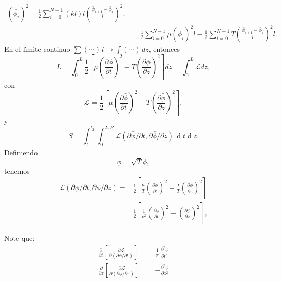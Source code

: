 \begin{frame}
\begin{align}
  \left(
    \dot{\bar{\phi_i}}
  \right)^2-\frac{1}{2}\sum_{i=0}^{N-1}(k l) l
  \left(
\frac{\bar\phi_{i+1}-\bar\phi_{i}}{l}
  \right)^2.\nonumber\\
&=\frac{1}{2}\sum_{i=0}^{N-1}\mu
  \left(
    \dot{\bar{\phi_i}}
  \right)^2l-\frac{1}{2}\sum_{i=0}^{N-1}T
  \left(
\frac{\bar\phi_{i+1}-\bar\phi_{i}}{l}
  \right)^2l.
\label{eq:1strLsumm}
\end{align}
En el l\'\i mite continuo $\sum(\cdots)\,l\to\int(\cdots)\,dz$, entonces 
\begin{equation}
\label{eq:238}
  L=\int_0^L\frac{1}{2}
\left[
  \mu\left(\frac{\partial\bar\phi}{\partial t}\right)^2- T\left(\frac{\partial\bar\phi}{\partial z}\right)^2
\right]dz=\int_0^L\mathcal{L}dz,
\end{equation}
con
\begin{equation}
  \label{eq:call1}
  \mathcal{L}=\frac{1}{2}
\left[
  \mu\left(\frac{\partial\bar\phi}{\partial t}\right)^2- T\left(\frac{\partial\bar\phi}{\partial z}\right)^2
\right],
\end{equation}
y
\begin{equation}
  \label{eq:Scall}
  S=\int_{t_1}^{t_2}\int_0^{2\pi R}\mathcal{L}\left( \partial\bar\phi/\partial t,\partial\bar\phi/\partial z
  \right)\,\operatorname{d}t\operatorname{d}z.
\end{equation}
Definiendo
\begin{equation}
  \label{eq:barff}
  \phi=\sqrt{T}\bar\phi,
\end{equation}
tenemos
\begin{align}
  \label{eq:call2}
  \mathcal{L}(\partial\phi/\partial t,\partial\phi/\partial z)=&
\frac{1}{2}
\left[
  \frac{\mu}{T}\left(\frac{\partial\phi}{\partial t}\right)^2- \frac{T}{T}\left(\frac{\partial\phi}{\partial z}\right)^2
\right]\nonumber\\
=&\frac{1}{2}
\left[
  \frac{1}{v^2}\left(\frac{\partial\phi}{\partial t}\right)^2-\left(\frac{\partial\phi}{\partial z}\right)^2
\right],
\end{align}
\end{frame}
Note que:
\begin{align}
  \label{eq:dcalt}
  \frac{\partial}{\partial t}
  \left[
    \frac{\partial\mathcal{L}}{\partial
      (\partial\phi/\partial t)}
  \right]&=    \frac{1}{v^2}\frac{\partial^2\phi}{\partial t^2}\\
  \label{eq:dcalz} %
  \frac{\partial}{\partial z}
  \left[
    \frac{\partial\mathcal{L}}{\partial
      (\partial\phi/\partial z)}
  \right]&= -\frac{\partial^2\phi}{\partial z^2}
\end{align}


